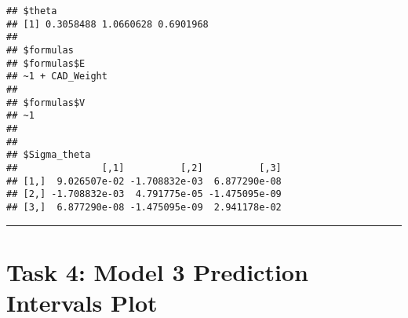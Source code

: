 \documentclass[]{article}
\newenvironment{Shaded}{\begin{snugshade}}{\end{snugshade}}
\newcommand{\KeywordTok}[1]{\textcolor[rgb]{0.13,0.29,0.53}{\textbf{#1}}}
\newcommand{\DataTypeTok}[1]{\textcolor[rgb]{0.13,0.29,0.53}{#1}}
\newcommand{\DecValTok}[1]{\textcolor[rgb]{0.00,0.00,0.81}{#1}}
\newcommand{\StringTok}[1]{\textcolor[rgb]{0.31,0.60,0.02}{#1}}
\newcommand{\CommentTok}[1]{\textcolor[rgb]{0.56,0.35,0.01}{\textit{#1}}}
\newcommand{\OperatorTok}[1]{\textcolor[rgb]{0.81,0.36,0.00}{\textbf{#1}}}
\newcommand{\NormalTok}[1]{#1}
\begin{document}
\begin{Shaded}
\end{Shaded}

\begin{verbatim}
## $theta
## [1] 0.3058488 1.0660628 0.6901968
## 
## $formulas
## $formulas$E
## ~1 + CAD_Weight
## 
## $formulas$V
## ~1
## 
## 
## $Sigma_theta
##               [,1]          [,2]          [,3]
## [1,]  9.026507e-02 -1.708832e-03  6.877290e-08
## [2,] -1.708832e-03  4.791775e-05 -1.475095e-09
## [3,]  6.877290e-08 -1.475095e-09  2.941178e-02
\end{verbatim}

\begin{center}\rule{0.5\linewidth}{\linethickness}\end{center}

\section{Task 4: Model 3 Prediction Intervals
Plot}\label{task-4-model-3-prediction-intervals-plot}
\end{document}
